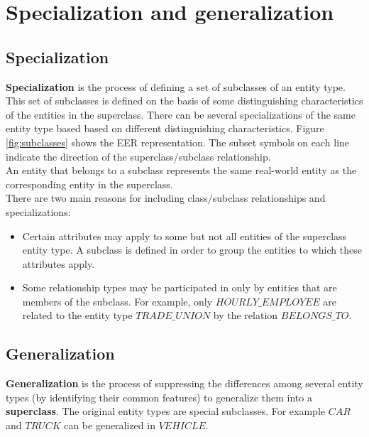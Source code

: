 \section{Specialization and generalization}

\subsection{Specialization}

\textbf{Specialization} is the process of defining a set of subclasses of an entity type. This set of subclasses is defined on the basis of some distinguishing characteristics of the entities in the superclass. There can be several specializations of the same entity type based based on different distinguishing characteristics.
Figure \ref{fig:subclasses} shows the EER representation. The subset symbols on each line indicate the direction of the superclass/subclass relationship.\\

An entity that belongs to a subclass represents the same real-world entity as the corresponding entity in the superclass.\\

There are two main reasons for including class/subclass relationships and specializations:\\

\begin{itemize}
    \item Certain attributes may apply to some but not all entities of the superclass entity type. A subclass is defined in order to group the entities to which these attributes apply.
    \item Some relationship types may be participated in only by entities that are members of the subclass. For example, only $HOURLY\_EMPLOYEE$ are related to the entity type $TRADE\_UNION$ by the relation $BELONGS\_TO$.
\end{itemize}
    
\subsection{Generalization}

\textbf{Generalization} is the process of suppressing the differences among several entity types (by identifying their common features) to generalize them into a \textbf{superclass}. The original entity types are special subclasses. For example $CAR$ and $TRUCK$ can be generalized in $VEHICLE$.

